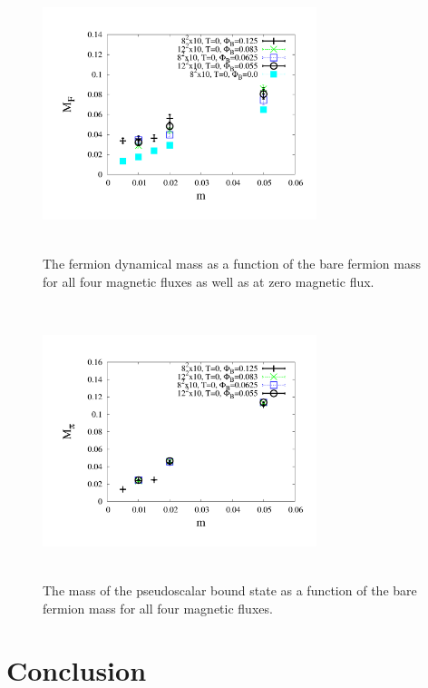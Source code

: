 \documentclass[aps,prd,twocolumn,showpacs,superscriptaddress,groupedaddress]{revtex4}  %
\begin{document}
\begin{figure}
  \includegraphics[height=8cm,width=8cm]{ferm_mt_vs_m_graphene_paper.pdf} \hspace{-1cm}
\caption{The fermion dynamical mass as a function of the bare fermion mass for all four magnetic fluxes as well as at zero magnetic flux.}
\label{MFvsm}
\end{figure}

\begin{figure}
  \includegraphics[height=8cm,width=8cm]{ps_mt_vs_m_2exp_graphene_paper.pdf} \hspace{-1cm}
\caption{The mass of the pseudoscalar bound state as a function of the bare fermion mass for all four magnetic fluxes.}
\label{MPSvsm}
\end{figure}

\section{\label{sec:Conclusion}Conclusion}
\end{document}
